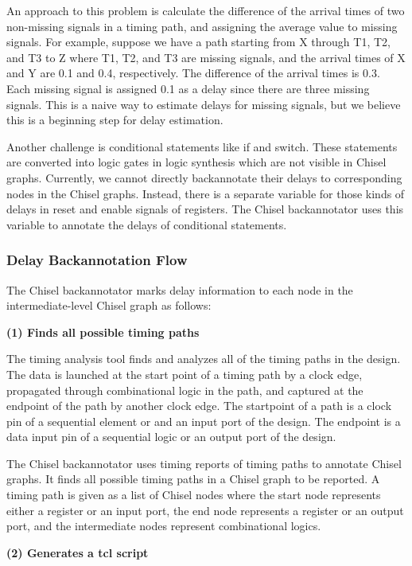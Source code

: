 An approach to this problem is calculate the difference of the arrival times of two non-missing signals in a timing path, and assigning the average value to missing signals. For example, suppose we have a path starting from X through T1, T2, and T3 to Z where T1, T2, and T3 are missing signals, and the arrival times of X and Y are 0.1 and 0.4, respectively. The difference of the arrival times is 0.3.  Each missing signal is assigned 0.1 as a delay since there are three missing signals. This is a naive way to estimate delays for missing signals, but we believe this is a beginning step for delay estimation.

Another challenge is conditional statements like if and switch. These statements are converted into logic gates in logic synthesis which are not visible in Chisel graphs. Currently, we cannot directly backannotate their delays to corresponding nodes in the Chisel graphs. Instead, there is a separate variable for those kinds of delays in reset and enable signals of registers. The Chisel backannotator uses this variable to annotate the delays of conditional statements.

\subsubsection{Delay Backannotation Flow}
The Chisel backannotator marks delay information to each node in the intermediate-level Chisel graph as follows:

{\bf (1) Finds all possible timing paths}
	
The timing analysis tool finds and analyzes all of the timing paths in the design. The data is launched at the start point of a timing path by a clock edge, propagated through combinational logic in the path, and captured at the endpoint of the path by another clock edge. The startpoint of a path is a clock pin of a sequential element or and an input port of the design. The endpoint is a data input pin of a sequential logic or an output port of the design. 

The Chisel backannotator uses timing reports of timing paths to annotate Chisel graphs. It finds all possible timing paths in a Chisel graph to be reported. A timing path is given as a list of Chisel nodes where the start node represents either a register or an input port, the end node represents a register or an output port, and the intermediate nodes represent combinational logics. 

{\bf (2) Generates a tcl script}

